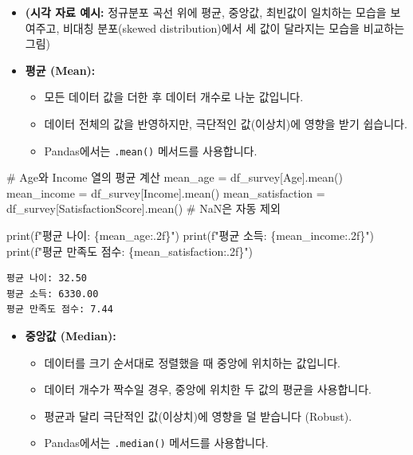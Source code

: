 \documentclass[
  letterpaper,
]{book}
\newenvironment{Shaded}{\begin{snugshade}}{\end{snugshade}}
\newcommand{\BuiltInTok}[1]{\textcolor[rgb]{0.00,0.23,0.31}{#1}}
\newcommand{\CommentTok}[1]{\textcolor[rgb]{0.37,0.37,0.37}{#1}}
\newcommand{\NormalTok}[1]{\textcolor[rgb]{0.00,0.23,0.31}{#1}}
\newcommand{\OperatorTok}[1]{\textcolor[rgb]{0.37,0.37,0.37}{#1}}
\newcommand{\SpecialCharTok}[1]{\textcolor[rgb]{0.37,0.37,0.37}{#1}}
\newcommand{\SpecialStringTok}[1]{\textcolor[rgb]{0.13,0.47,0.30}{#1}}
\newcommand{\StringTok}[1]{\textcolor[rgb]{0.13,0.47,0.30}{#1}}
\providecommand{\tightlist}{%
  \setlength{\itemsep}{0pt}\setlength{\parskip}{0pt}}
\begin{document}
\begin{itemize}
\item
  \textbf{(시각 자료 예시:} 정규분포 곡선 위에 평균, 중앙값, 최빈값이
  일치하는 모습을 보여주고, 비대칭 분포(skewed distribution)에서 세 값이
  달라지는 모습을 비교하는 그림)
\item
  \textbf{평균 (Mean):}

  \begin{itemize}
  \tightlist
  \item
    모든 데이터 값을 더한 후 데이터 개수로 나눈 값입니다.
  \item
    데이터 전체의 값을 반영하지만, 극단적인 값(이상치)에 영향을 받기
    쉽습니다.
  \item
    Pandas에서는 \texttt{.mean()} 메서드를 사용합니다.
  \end{itemize}
\end{itemize}

\begin{Shaded}
\begin{Highlighting}[]
    \CommentTok{\# Age와 Income 열의 평균 계산}
\NormalTok{    mean\_age }\OperatorTok{=}\NormalTok{ df\_survey[}\StringTok{\textquotesingle{}Age\textquotesingle{}}\NormalTok{].mean()}
\NormalTok{    mean\_income }\OperatorTok{=}\NormalTok{ df\_survey[}\StringTok{\textquotesingle{}Income\textquotesingle{}}\NormalTok{].mean()}
\NormalTok{    mean\_satisfaction }\OperatorTok{=}\NormalTok{ df\_survey[}\StringTok{\textquotesingle{}SatisfactionScore\textquotesingle{}}\NormalTok{].mean() }\CommentTok{\# NaN은 자동 제외}

    \BuiltInTok{print}\NormalTok{(}\SpecialStringTok{f"평균 나이: }\SpecialCharTok{\{}\NormalTok{mean\_age}\SpecialCharTok{:.2f\}}\SpecialStringTok{"}\NormalTok{)}
    \BuiltInTok{print}\NormalTok{(}\SpecialStringTok{f"평균 소득: }\SpecialCharTok{\{}\NormalTok{mean\_income}\SpecialCharTok{:.2f\}}\SpecialStringTok{"}\NormalTok{)}
    \BuiltInTok{print}\NormalTok{(}\SpecialStringTok{f"평균 만족도 점수: }\SpecialCharTok{\{}\NormalTok{mean\_satisfaction}\SpecialCharTok{:.2f\}}\SpecialStringTok{"}\NormalTok{)}
\end{Highlighting}
\end{Shaded}

\begin{verbatim}
평균 나이: 32.50
평균 소득: 6330.00
평균 만족도 점수: 7.44
\end{verbatim}

\begin{itemize}
\tightlist
\item
  \textbf{중앙값 (Median):}

  \begin{itemize}
  \tightlist
  \item
    데이터를 크기 순서대로 정렬했을 때 중앙에 위치하는 값입니다.
  \item
    데이터 개수가 짝수일 경우, 중앙에 위치한 두 값의 평균을 사용합니다.
  \item
    평균과 달리 극단적인 값(이상치)에 영향을 덜 받습니다 (Robust).
  \item
    Pandas에서는 \texttt{.median()} 메서드를 사용합니다.
  \end{itemize}
\end{itemize}
\end{document}
